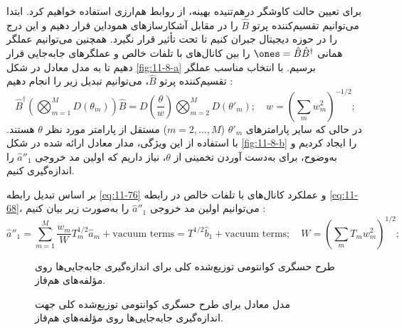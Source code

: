 برای تعیین حالت کاوشگر درهم‌تنیده بهینه، از روابط هم‌ارزی استفاده خواهیم کرد. ابتدا می‌توانیم تقسیم‌کننده پرتو $\hat{B}$ را در مقابل آشکارسازهای هموداین قرار دهیم و این درج را در حوزه دیجیتال جبران کنیم تا  تحت تأثیر قرار نگیرد. همچنین می‌توانیم عملگر همانی $\ones = \hat{B}\hat{B}^\dagger$ را بین کانال‌های با تلفات خالص و عملگرهای جابه‌جایی قرار دهیم تا به مدل معادل در شکل \ref{fig:11-8-a} برسیم. با انتخاب مناسب عملگر تقسیم‌کننده پرتو $\hat{B}$، می‌توانیم تبدیل زیر را انجام دهیم \cite{20}:
\begin{equation}
	\hat{B}^\dagger \left( \bigotimes_{m=1}^M D(\theta_m) \right) \hat{B} = D\left(\frac{\theta}{w}\right) \bigotimes_{m=2}^M D(\theta'_m); \quad w = \left( \sum_m w_m^2 \right)^{-1/2};
	\label{eq:11-76}
\end{equation}
در حالی که سایر پارامترهای $\theta'_m$ ($m = 2, \dots, M$) مستقل از پارامتر مورد نظر $\theta$ هستند. با استفاده از این ویژگی، مدار معادل ارائه شده در شکل \ref{fig:11-8-b} را ایجاد کردیم و به‌وضوح، برای به‌دست آوردن تخمینی از $\theta$، نیاز داریم که اولین مد خروجی $\hat{a}''_1$ را اندازه‌گیری کنیم.

بر اساس تبدیل رابطه \eqref{eq:11-76} و عملکرد کانال‌های با تلفات خالص در رابطه \eqref{eq:11-68}، می‌توانیم اولین مد خروجی $\hat{a}''_1$ را به‌صورت زیر بیان کنیم \cite{20, 25}:
\begin{equation}
	\hat{a}''_1 = \sum_{m=1}^M \frac{w_m}{W} T_m^{1/2} \hat{a}_m + \text{vacuum terms} = T^{1/2} \hat{b}_1 + \text{vacuum terms}; \quad W = \left( \sum_m T_m w_m^2 \right)^{1/2};
	\label{eq:11-77}
\end{equation}

\begin{figure}[ht]
	\centering
	\caption{طرح حسگری کوانتومی توزیع‌شده کلی برای اندازه‌گیری جابه‌جایی‌ها روی مؤلفه‌های هم‌فاز.}
	\label{fig:11-7}
\end{figure}

\begin{figure}[ht]
	\centering
	\hfill
	\caption{مدل معادل برای طرح حسگری کوانتومی توزیع‌شده کلی جهت اندازه‌گیری جابه‌جایی‌ها روی مؤلفه‌های هم‌فاز.}
	\label{fig:11-8}
\end{figure}

